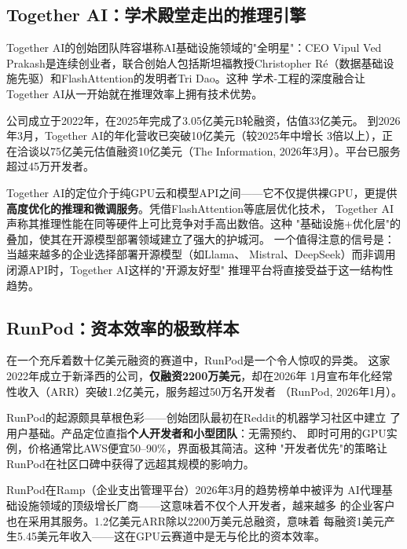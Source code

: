 \subsection{Together AI：学术殿堂走出的推理引擎}
\label{subsec:together}

Together AI的创始团队阵容堪称AI基础设施领域的"全明星"：CEO Vipul
Ved Prakash是连续创业者，联合创始人包括斯坦福教授Christopher
R\'{e}（数据基础设施先驱）和FlashAttention的发明者Tri Dao。这种
学术-工程的深度融合让Together AI从一开始就在推理效率上拥有技术优势。

公司成立于2022年，在2025年完成了3.05亿美元B轮融资，估值33亿美元。
到2026年3月，Together AI的年化营收已突破10亿美元（较2025年中增长
3倍以上），正在洽谈以75亿美元估值融资10亿美元（The Information,
2026年3月）。平台已服务超过45万开发者。

Together AI的定位介于纯GPU云和模型API之间——它不仅提供裸GPU，更提供
\textbf{高度优化的推理和微调服务}。凭借FlashAttention等底层优化技术，
Together AI声称其推理性能在同等硬件上可比竞争对手高出数倍。这种
"基础设施+优化层"的叠加，使其在开源模型部署领域建立了强大的护城河。
一个值得注意的信号是：当越来越多的企业选择部署开源模型（如Llama、
Mistral、DeepSeek）而非调用闭源API时，Together AI这样的"开源友好型"
推理平台将直接受益于这一结构性趋势。

\subsection{RunPod：资本效率的极致样本}
\label{subsec:runpod}

在一个充斥着数十亿美元融资的赛道中，RunPod是一个令人惊叹的异类。
这家2022年成立于新泽西的公司，\textbf{仅融资2200万美元}，却在2026年
1月宣布年化经常性收入（ARR）突破1.2亿美元，服务超过50万名开发者
（RunPod, 2026年1月）。

RunPod的起源颇具草根色彩——创始团队最初在Reddit的机器学习社区中建立
了用户基础。产品定位直指\textbf{个人开发者和小型团队}：无需预约、
即时可用的GPU实例，价格通常比AWS便宜50--90\%，界面极其简洁。这种
"开发者优先"的策略让RunPod在社区口碑中获得了远超其规模的影响力。

RunPod在Ramp（企业支出管理平台）2026年3月的趋势榜单中被评为
AI代理基础设施领域的顶级增长厂商——这意味着不仅个人开发者，越来越多
的企业客户也在采用其服务。1.2亿美元ARR除以2200万美元总融资，意味着
每融资1美元产生5.45美元年收入——这在GPU云赛道中是无与伦比的资本效率。

